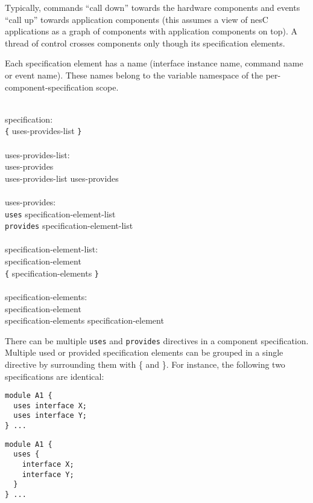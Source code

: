 \documentclass[11pt]{article}
\newcommand{\kw}[1]{{\tt #1}}
\newcommand{\nesc}{nesC\xspace}
\begin{document}
Typically, commands ``call down'' towards the hardware components and
events ``call up'' towards application components (this assumes a view of
\nesc applications as a graph of components with application components on
top). A thread of control crosses components only though its specification
elements.

Each specification element has a name (interface instance name, command
name or event name). These names belong to the variable namespace of the
per-component-specification scope.  \em \begin{tabbing}
\hspace*{2cm}\= \\ \kill
specification:\\
\>	\kw{\{} uses-provides-list \kw{\}}\\
\\
uses-provides-list:\\
\>	uses-provides\\
\>	uses-provides-list uses-provides\\
\\
uses-provides:\\
\>	\kw{uses} specification-element-list\\
\>	\kw{provides} specification-element-list\\
\\
specification-element-list:\\
\>	specification-element\\
\>	\kw{\{} specification-elements \kw{\}}\\
\\
specification-elements:\\
\>	specification-element\\
\>	specification-elements specification-element\\
\end{tabbing} \rm
There can be multiple \kw{uses} and \kw{provides} directives in a component
specification. Multiple used or provided specification elements can be
grouped in a single directive by surrounding them with \{ and \}. For
instance, the following two specifications are identical:

\begin{minipage}[t]{3in}
\begin{verbatim}
module A1 {
  uses interface X;
  uses interface Y;
} ...
\end{verbatim}
\end{minipage}
\begin{minipage}[t]{3in}
\begin{verbatim}
module A1 {
  uses {
    interface X;
    interface Y;
  }
} ...
\end{verbatim}
\end{minipage}
\end{document}
